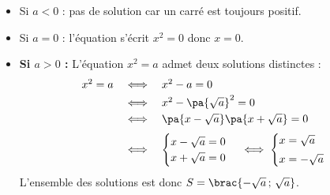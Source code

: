 \begin{demo}[Solutions de $x^2 = a$]
	\nline
	\begin{itemize}
		\item Si $a < 0$ : pas de solution car un carré est toujours positif.
		\item Si $a = 0$ : l'équation s'écrit $x^2 = 0$ donc $x = 0$.
		\item \textbf{Si $a > 0$ :} L'équation $x^2 = a$ admet deux solutions distinctes :
		      \[
			      \begin{array}{rcl}
				      x^2 = a & \iff & x^2 - a = 0                            \\[1mm]
				              & \iff & x^2 - \pa{\sqrt{a}}^2 = 0              \\[1mm]
				              & \iff & \pa{x - \sqrt{a}}\pa{x + \sqrt{a}} = 0 \\[2mm]
				              & \iff & \begin{cases}
					                       x - \sqrt{a} = 0 \\
					                       x + \sqrt{a} = 0
				                       \end{cases} \iff \begin{cases}
					                                        x = \sqrt{a} \\[1mm]
					                                        x = -\sqrt{a}
				                                        \end{cases}
			      \end{array}
		      \]
		      L'ensemble des solutions est donc $S = \brac{-\sqrt{a} \,;\, \sqrt{a}}$.
	\end{itemize}
\end{demo}

